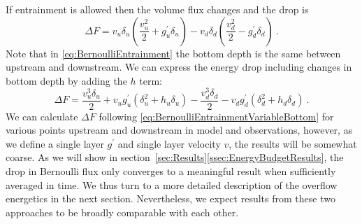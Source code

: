 \documentclass{ametsocV6.1}
\begin{document}
If entrainment is allowed then the volume flux changes and the drop is
\begin{equation}
\Delta F = v_u \delta_u (\frac{v_u^2}{2} + g^\prime_u \delta_u) - v_d \delta_d(\frac{v_d^2}{2} -g^\prime_d \delta_d)\ .
\label{eq:BernoulliEntrainment}
\end{equation}
Note that in \eqref{eq:BernoulliEntrainment} the bottom depth is the same between upstream and downstream.
We can express the energy drop including changes in bottom depth by adding the $h$ term:
\begin{equation}
\Delta F = \frac{v_u^3 \delta_u}{2} + v_u g^\prime_u (\delta_u^2 + h_u \delta_u) - \frac{v_d^3 \delta_d}{2} -v_d g^\prime_d (\delta_d^2 + h_d \delta_d)\ .
\label{eq:BernoulliEntrainmentVariableBottom}
\end{equation}
We can calculate $\Delta F$ following \eqref{eq:BernoulliEntrainmentVariableBottom} for various points upstream and downstream in model and observations, however, as we define a single layer $g^\prime$ and single layer velocity $v$, the results will be somewhat coarse.
As we will show in section~\ref{sec:Results}\ref{ssec:EnergyBudgetResults}, the drop in Bernoulli flux only converges to a meaningful result when sufficiently averaged in time.
We thus turn to a more detailed description of the overflow energetics in the next section.
Nevertheless, we expect results from these two approaches to be broadly comparable with each other.
\end{document}
